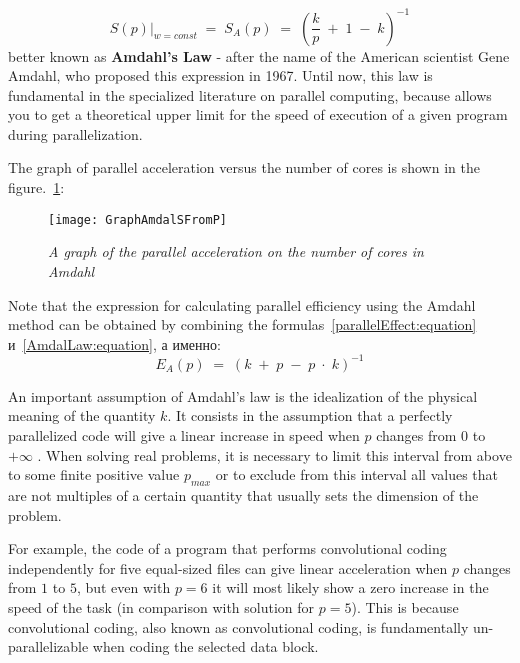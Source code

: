 {	\begin{equation}
		\label{AmdalLaw:equation}
		\left.S(p)\right|_{w=const}\;=\;S_A(p)\;=\;\left(\frac kp\;+\;1\;-\;k\right)^{-1}
	\end{equation}
	better known as \textbf{Amdahl’s Law} - after the name of the American scientist Gene Amdahl, who proposed this expression in 1967. Until now, this law is fundamental in the specialized literature on parallel computing, because allows you to get a theoretical upper limit for the speed of execution of a given program during parallelization.
	\par The graph of parallel acceleration versus the number of cores is shown in the figure.~\ref{GraphAmdalSFromP:image}:
	\begin{figure}[H]
		\texttt{[image: GraphAmdalSFromP]}
		\caption{\textit{A graph of the parallel acceleration on the number of cores in Amdahl}}
		\label{GraphAmdalSFromP:image}
	\end{figure}
	\par Note that the expression for calculating parallel efficiency using the Amdahl method can be obtained by combining the formulas~\eqref{parallelEffect:equation} и~\eqref{AmdalLaw:equation}, а именно:
	\begin{equation}
		E_A(p)\;=\;\left(k\;+\;p\;-\;p\;\cdot\;k\right)^{-1}
	\end{equation}
	\par An important assumption of Amdahl's law is the idealization of the physical meaning of the quantity $k$. It consists in the assumption that a perfectly parallelized code will give a linear increase in speed when $ p $ changes from $0$ to $+\infty$ . When solving real problems, it is necessary to limit this interval from above to some finite positive value $p_{max}$ or to exclude from this interval all values that are not multiples of a certain quantity that usually sets the dimension of the problem.
	\par For example, the code of a program that performs convolutional coding independently for five equal-sized files can give linear acceleration when $p$ changes from $1$ to $5$, but even with $p = 6$ it will most likely show a zero increase in the speed of the task (in comparison with solution for $p = 5$). This is because convolutional coding, also known as convolutional coding, is fundamentally un-parallelizable when coding the selected data block.
	\par
}